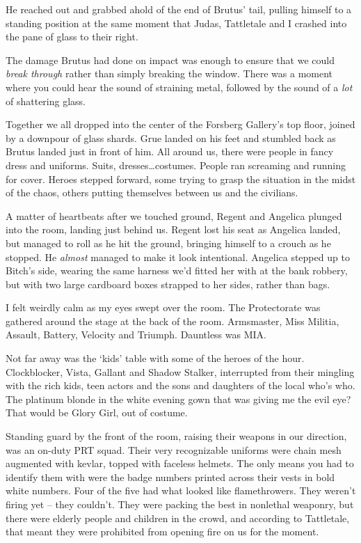 He reached out and grabbed ahold of the end of Brutus' tail, pulling himself to a standing position at the same moment that Judas, Tattletale and I crashed into the pane of glass to their right.



The damage Brutus had done on impact was enough to ensure that we could \emph{break through} rather than simply breaking the window.  There was a moment where you could hear the sound of straining metal, followed by the sound of a \emph{lot} of shattering glass.



Together we all dropped into the center of the Forsberg Gallery's top floor, joined by a downpour of glass shards.  Grue landed on his feet and stumbled back as Brutus landed just in front of him.  All around us, there were people in fancy dress and uniforms.  Suits, dresses\ldots costumes.  People ran screaming and running for cover.  Heroes stepped forward, some trying to grasp the situation in the midst of the chaos, others putting themselves between us and the civilians.



A matter of heartbeats after we touched ground, Regent and Angelica plunged into the room, landing just behind us.  Regent lost his seat as Angelica landed, but managed to roll as he hit the ground, bringing himself to a crouch as he stopped.  He \emph{almost }managed to make it look intentional.  Angelica stepped up to Bitch's side, wearing the same harness we'd fitted her with at the bank robbery, but with two large cardboard boxes strapped to her sides, rather than bags.



I felt weirdly calm as my eyes swept over the room.  The Protectorate was gathered around the stage at the back of the room.  Armsmaster, Miss Militia, Assault, Battery, Velocity and Triumph.  Dauntless was MIA.



Not far away was the `kids' table with some of the heroes of the hour.  Clockblocker, Vista, Gallant and Shadow Stalker, interrupted from their mingling with the rich kids, teen actors and the sons and daughters of the local who's who.  The platinum blonde in the white evening gown that was giving me the evil eye?  That would be Glory Girl, out of costume.



Standing guard by the front of the room, raising their weapons in our direction, was an on-duty PRT squad.  Their very recognizable uniforms were chain mesh augmented with kevlar, topped with faceless helmets.  The only means you had to identify them with were the badge numbers printed across their vests in bold white numbers.   Four of the five had what looked like flamethrowers.  They weren't firing yet – they couldn't.  They were packing the best in nonlethal weaponry, but there were elderly people and children in the crowd, and according to Tattletale, that meant they were prohibited from opening fire on us for the moment.



